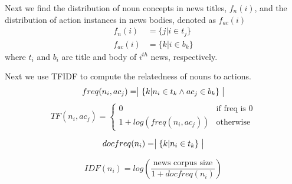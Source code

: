Next we find the distribution of noun concepts in news titles, $f_n(i)$, and the distribution of action instances in news bodies,
denoted as $f_{ac}(i)$
\begin{align*}
    f_n(i) & = \{ j |  i \in t_j \} \\
    f_{ac}(i) &= \{ k | i \in b_k \}
\end{align*}
where $t_i$ and $b_i$ are title and body of $i^{th}$ news, respectively.

Next we use TFIDF to compute the relatedness of nouns to actions.
\begin{equation*}
    freq(n_i, ac_j) = \bigm| \{ k | n_i \in t_k \land ac_j \in b_k \} \bigm|
\end{equation*}
\begin{equation*}
    TF(n_i, ac_j) = \begin{cases} 0 &\mbox{if freq is 0} \\
        1 + log(freq(n_i, ac_j)) &\mbox{otherwise}
    \end{cases}
\end{equation*}


\begin{equation*}
    docfreq(n_i) = \bigm| \{ k | n_i \in t_k \} \bigm|
\end{equation*}


\begin{equation*}
    IDF(n_i) = log(\frac{\text{news corpus size}}{1 + docfreq(n_i)})
\end{equation*}
